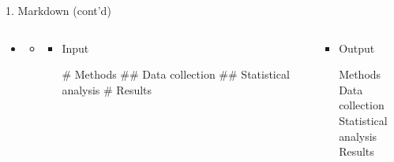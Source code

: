 \documentclass[14pt, aspectratio=169, sectionpage=simple, xclolor=table]{beamer}
\begin{document}
\begin{frame}[fragile, t]{1. Markdown (cont'd)}
\begin{itemize}
	\item {}
	\begin{itemize}
		\item[] 
		
		\begin{columns}
			\begin{column}{0.45\textwidth}
				\vspace{1cm}
				\begin{itemize}
					\item Input
					
					\begin{code11}
						# Methods
						## Data collection
						## Statistical analysis
						# Results
					\end{code11}
				\end{itemize}
				
			\end{column}%
			\hfill
			\begin{column}{0.45\textwidth}
				\vspace{1cm}
				\begin{itemize}
					\item Output
					
					\large{Methods}
					\\
					\normalsize{Data collection}
					\\
					\normalsize{Statistical analysis}
					\\
					\large{Results}  
				\end{itemize}
				
			\end{column}%
		\end{columns}
	\end{itemize}
\end{itemize}
\end{frame}
\end{document}
